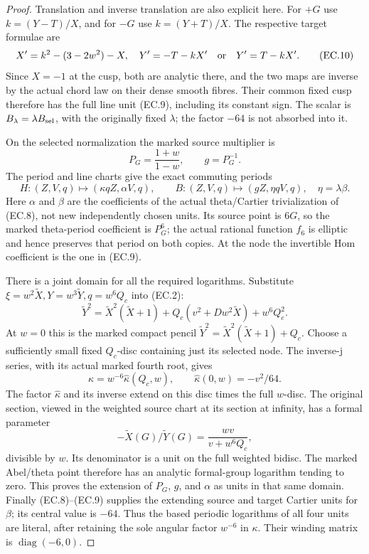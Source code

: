 \begin{proof}
Translation and inverse translation are also explicit here. For
\(+G\) use \(k=(Y-T)/X\), and for \(-G\) use \(k=(Y+T)/X\).
The respective target formulae are
\[
 X'=k^2-(3-2w^2)-X,\quad
 Y'=-T-kX'\quad\hbox{or}\quad Y'=T-kX'.
 \tag{EC.10}
\]
Since \(X=-1\) at the cusp, both are analytic there, and the two
maps are inverse by the actual chord law on their dense smooth
fibres. Their common fixed cusp therefore has the full line unit
(EC.9), including its constant sign. The scalar is
\(B_\lambda=\lambda B_{\rm sel}\), with the originally fixed
\(\lambda\); the factor \(-64\) is not absorbed into it.

On the selected normalization the marked source multiplier is
\[
 P_G=\frac{1+w}{1-w},\qquad g=P_G^{-1}.
 \tag{EC.11}
\]
The period and line charts give the exact commuting periods
\[
 H:(Z,V,q)\mapsto(\kappa qZ,\alpha V,q),\qquad
 B:(Z,V,q)\mapsto(gZ,\eta qV,q),\quad\eta=\lambda\beta.
 \tag{EC.12}
\]
Here \(\alpha\) and \(\beta\) are the coefficients of the actual
theta/Cartier trivialization of (EC.8), not new independently chosen
units. Its source point is \(6G\), so the marked theta-period
coefficient is \(P_G^6\); the actual rational function \(f_6\)
is elliptic and hence preserves that period on both copies. At the
node the invertible Hom coefficient is the one in (EC.9).

There is a joint domain for all the required logarithms. Substitute
\(\xi=w^2\widetilde X,Y=w^3\widetilde Y,q=w^6Q_c\) into (EC.2):
\[
 \widetilde Y^2=\widetilde X^2(\widetilde X+1)
       +Q_c(v^2+Dw^2\widetilde X)+w^6Q_c^2.
 \tag{EC.13}
\]
At \(w=0\) this is the marked compact pencil
\(\widetilde Y^2=\widetilde X^2(\widetilde X+1)+Q_c\).
Choose a sufficiently small fixed \(Q_c\)-disc containing just its
selected node. The inverse-j series, with its actual marked fourth
root, gives
\[
 \kappa=w^{-6}\widehat\kappa(Q_c,w),\qquad
 \widehat\kappa(0,w)=-v^2/64.
 \tag{EC.14}
\]
The factor \(\widehat\kappa\) and its inverse extend on this disc
times the full \(w\)-disc. The original section, viewed in the
weighted source chart at its section at infinity, has a formal
parameter
\[
 -\widetilde X(G)/\widetilde Y(G)
       =\frac{wv}{v+w^6Q_c},
 \tag{EC.14a}
\]
divisible by \(w\). Its denominator is a unit on the full
weighted bidisc. The marked Abel/theta point
therefore has an analytic formal-group logarithm tending to zero.
This proves the extension of \(P_G\), \(g\), and \(\alpha\) as
units in that same domain. Finally (EC.8)--(EC.9) supplies the
extending source and target Cartier units for \(\beta\); its
central value is \(-64\). Thus the based periodic logarithms of
all four units are literal, after retaining the sole angular factor
\(w^{-6}\) in \(\kappa\). Their winding matrix is
\(\operatorname{diag}(-6,0)\).


\end{proof}
